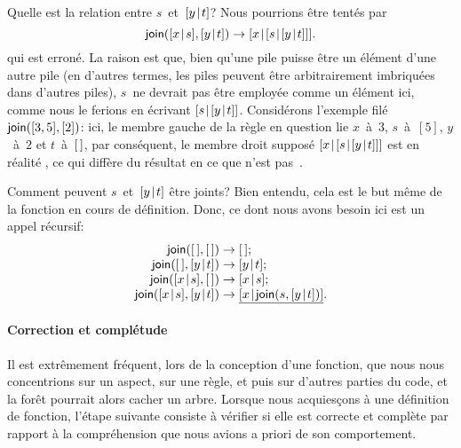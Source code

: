 Quelle est la relation entre \(s\)~et~\([{y}\!\mid\!{t}]\)? Nous pourrions
être tentés par
\begin{equation*}
\fun{join}(\cons{x}{s},\cons{y}{t}) \rightarrow
  \cons{x}{\cons{s}{\cons{y}{t}}}.
\end{equation*}
qui est erroné. La raison est que, bien qu'une pile puisse être un
élément d'une autre pile (en d'autres termes, les piles peuvent être
arbitrairement imbriquées dans d'autres piles), \(s\)~ne devrait pas
être employée comme un élément ici, comme nous le ferions en écrivant
\([{s}\!\mid\!{[{y}\!\mid\!{t}]}]\). Considérons l'exemple filé
\(\textsf{join}([3,5],[2])\): ici, le membre gauche de la règle en
question lie \(x\)~à~\(3\), \(s\)~à~\([5]\), \(y\)~à~\(2\) et
\(t\)~à~\([\,]\), par conséquent, le membre droit supposé
\([{x}\!\mid\!{[{s}\!\mid\!{[{y}\!\mid\!{t}]}]}]\) est en réalité
, ce qui diffère du résultat
 en ce que \erlcode{[5]} n'est
pas~.

Comment peuvent \(s\)~et~\([{y}\!\mid\!{t}]\) être joints? Bien entendu,
cela est le but même de la fonction  en cours de
définition. Donc, ce dont nous avons besoin ici est un appel récursif:
\begin{equation*}
\begin{array}{r@{\;}l@{\;}l}
\fun{join}(\el,\el) & \rightarrow & \el;\\
\fun{join}(\el,\cons{y}{t}) & \rightarrow & \cons{y}{t};\\
\fun{join}(\cons{x}{s},\el) & \rightarrow & \cons{x}{s};\\
\fun{join}(\cons{x}{s},\cons{y}{t}) & \rightarrow & \underline{\cons{x}{\fun{join}(s,\cons{y}{t})}}.
\end{array}
\end{equation*}

\paragraph{Correction et complétude}

Il est extrêmement fréquent, lors de la conception d'une fonction, que
nous nous concentrions sur un aspect, sur une règle, et puis sur
d'autres parties du code, et la forêt pourrait alors cacher un
arbre. Lorsque nous acquiesçons à une définition de fonction, l'étape
suivante consiste à vérifier si elle est correcte et complète par
rapport à la compréhension que nous avions a priori de son
comportement.

